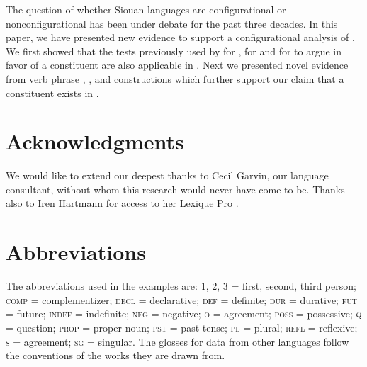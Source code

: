 \documentclass[output=paper]{LSP/langsci}
\begin{document}
The question of whether Siouan languages are configurational or nonconfigurational has been under debate for the past three decades. In this paper, we have presented new evidence to support a configurational analysis of .  We first showed that the tests previously used by \citet{Boyle2007} for , \citet{Graczyk1991a} for  and \citet{West2003} for  to argue in favor of a  constituent are also applicable in .  Next we presented novel evidence from  verb phrase , , and  constructions which further support our claim that a  constituent exists in . 

\section*{Acknowledgments}
We would like to extend our deepest thanks to Cecil Garvin, our language consultant, without whom this research would never have come to be. Thanks also to Iren Hartmann for access to her Lexique Pro .

\section*{Abbreviations}
The abbreviations used in the  examples are: 1, 2, 3 = first, second, third person; \textsc{comp} = complementizer; \textsc{decl} = declarative; \textsc{def} = definite; \textsc{dur} = durative; \textsc{fut} = future; \textsc{indef} = indefinite; \textsc{neg} = negative; \textsc{o} =  agreement; \textsc{poss} = possessive; \textsc{q} = question; \textsc{prop} = proper noun; \textsc{pst} = past tense; \textsc{pl} = plural; \textsc{refl} = reflexive; \textsc{s} =  agreement; \textsc{sg} = singular. The glosses for data from other languages follow the conventions of the works they are drawn from.
 
 

\printbibliography[heading=subbibliography,notkeyword=this]
\end{document}
